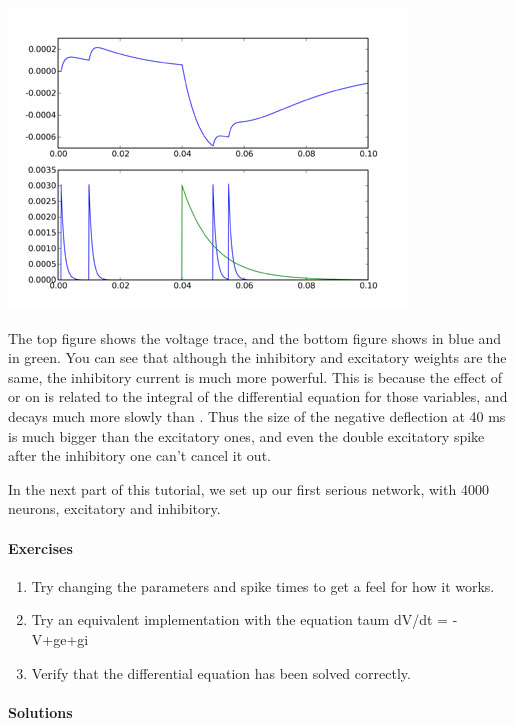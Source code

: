 \documentclass[letterpaper,10pt,english]{manual}
\begin{document}
\includegraphics{2b.jpg}

The top figure shows the voltage trace, and the bottom figure shows  in
blue and  in green. You can see that although the inhibitory and
excitatory weights are the same, the inhibitory current is much more
powerful. This is because the effect of  or  on  is related to the
integral of the differential equation for those variables, and  decays
much more slowly than . Thus the size of the negative deflection at
40 ms is much bigger than the excitatory ones, and even the double
excitatory spike after the inhibitory one can't cancel it out.

In the next part of this tutorial, we set up our first serious network,
with 4000 neurons, excitatory and inhibitory.


\paragraph{Exercises}
\begin{enumerate}
\item {} 
Try changing the parameters and spike times to get a feel for how it
works.

\item {} 
Try an equivalent implementation with the equation taum dV/dt = -V+ge+gi

\item {} 
Verify that the differential equation has been solved correctly.

\end{enumerate}


\paragraph{Solutions}
\end{document}
